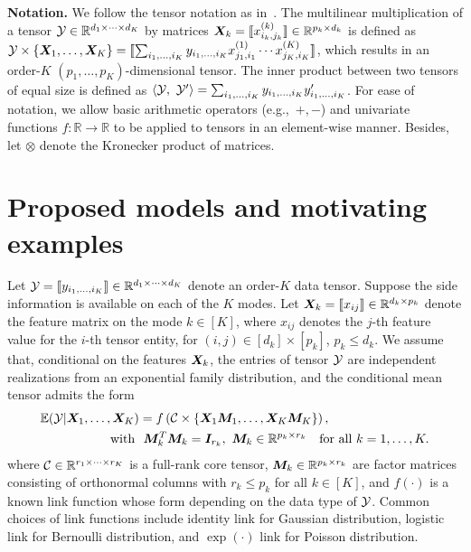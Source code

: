 \documentclass{article}
\theoremstyle{definition}
\theoremstyle{definition}
\begin{document}
{\bf Notation.} We follow the tensor notation as in~\cite{kolda2009tensor}. The multilinear multiplication of a tensor $\mathcal{Y}\in\mathbb{R}^{d_1\times \cdots\times d_K}$ by matrices $\bm X_k=\llbracket x_{i_k,j_k}^{(k)} \rrbracket\in\mathbb{R}^{p_k\times d_k}$ is defined as $\mathcal{Y}\times\{\bm X_1,\ldots,\bm X_K\} =\llbracket \sum_{i_1,\ldots,i_K}y_{i_1,\ldots,i_K}x_{j_1,i_1}^{(1)}\cdots x_{j_K,i_K}^{(K)} \rrbracket$,
which results in an order-$K$ $(p_1,\ldots,p_K)$-dimensional tensor. The inner product between two tensors of equal size is defined as $\langle \mathcal{Y},\ \mathcal{Y}'\rangle =\sum_{i_1,\ldots,i_K}y_{i_1,\ldots,i_K}y'_{i_1,\ldots,i_K}$. For ease of notation, we allow basic arithmetic operators (e.g.,\ $+, -$) and univariate functions $f\colon \mathbb{R}\to \mathbb{R}$ to be applied to tensors in an element-wise manner. Besides, let $\otimes$ denote the Kronecker product of matrices.

\vspace{-0.2cm}
\section{Proposed models and motivating examples}
\vspace{-0.2cm}
Let $\mathcal{Y}=\llbracket y_{i_1,\ldots,i_K} \rrbracket\in\mathbb{R}^{d_1\times \cdots\times d_K}$ denote an order-$K$ data tensor. Suppose the side information is available on each of the $K$ modes. Let $\bm X_k=\llbracket x_{ij} \rrbracket\in\mathbb{R}^{d_k\times p_k}$ denote the feature matrix on the mode $k\in[K]$, where $x_{ij}$ denotes the $j$-th feature value for the $i$-th tensor entity, for $(i,j)\in[d_k]\times[p_k]$, $p_k\leq d_k$. We assume that, conditional on the features $\bm X_k$, the entries of tensor $\mathcal{Y}$ are independent realizations from an exponential family distribution, and the conditional mean tensor admits the form
\begin{align}\label{eq:decomp}
\mathbb{E}(\tY|\mX_1,\ldots,\mX_K) &= f\left(\tC\times\{\mX_1\mM_1, \ldots, \mX_K\mM_K\}\right),\notag\\
\text{with} \ &\ \mM_k^T\mM_k = \mI_{r_k},\ \mM_k\in\mathbb{R}^{p_k\times r_k}\quad \text{for all }k=1,\ldots,K.
\end{align}
where $\mathcal{C}\in\mathbb{R}^{r_1\times \cdots \times r_K}$ is a full-rank core tensor, $\bm M_k\in\mathbb{R}^{p_k\times r_k}$ are factor matrices consisting of orthonormal columns with $r_k\leq p_k$ for all $k\in[K]$, and $f(\cdot)$ is a known link function whose form depending on the data type of $\mathcal{Y}$. Common choices of link functions include identity link for Gaussian distribution, logistic link for Bernoulli distribution, and $\exp(\cdot)$ link for Poisson distribution. 
\end{document}
